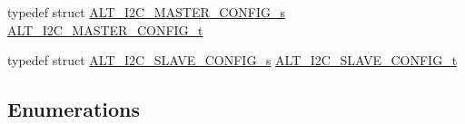 \begin{DoxyCompactItemize}
\item 
typedef struct \mbox{\hyperlink{structALT__I2C__MASTER__CONFIG__s}{A\+L\+T\+\_\+\+I2\+C\+\_\+\+M\+A\+S\+T\+E\+R\+\_\+\+C\+O\+N\+F\+I\+G\+\_\+s}} \mbox{\hyperlink{group__ALT__I2C_ga4f317dbba3080bb537f6c145ca30d503}{A\+L\+T\+\_\+\+I2\+C\+\_\+\+M\+A\+S\+T\+E\+R\+\_\+\+C\+O\+N\+F\+I\+G\+\_\+t}}
\item 
typedef struct \mbox{\hyperlink{structALT__I2C__SLAVE__CONFIG__s}{A\+L\+T\+\_\+\+I2\+C\+\_\+\+S\+L\+A\+V\+E\+\_\+\+C\+O\+N\+F\+I\+G\+\_\+s}} \mbox{\hyperlink{group__ALT__I2C_ga9c0d22378cb1d6eb0194ca424026081d}{A\+L\+T\+\_\+\+I2\+C\+\_\+\+S\+L\+A\+V\+E\+\_\+\+C\+O\+N\+F\+I\+G\+\_\+t}}
\end{DoxyCompactItemize}
\subsection*{Enumerations}
